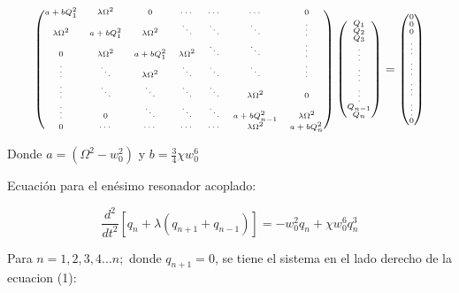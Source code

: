 \documentclass[11pt,letterpaper,twocolumn]{article}
\begin{document}
$${\fontsize{6}{6}\selectfont 
\begin{pmatrix} a+b{ Q }_{ 1 }^{ 2 } & \lambda { \Omega  }^{ 2 } & 0 & \cdots  & \cdots  & \cdots  & 0 \\ \lambda { \Omega  }^{ 2 } & a+b{ Q }_{ 1 }^{ 2 } & \lambda { \Omega  }^{ 2 } & \ddots  & \ddots  & \ddots  & \vdots  \\ 0 & \lambda { \Omega  }^{ 2 } & a+b{ Q }_{ 1 }^{ 2 } & \lambda { \Omega  }^{ 2 } & \ddots  & \ddots  & \vdots  \\ \vdots  & \ddots  & \lambda { \Omega  }^{ 2 } & \ddots  & \ddots  & \ddots  & \vdots  \\ \vdots  & \ddots  & \ddots  & \ddots  & \ddots  & \lambda { \Omega  }^{ 2 } & 0 \\ \vdots  & 0 & \ddots  & \ddots  & \ddots  & a+b{ Q }_{ n-1 }^{ 2 } & \lambda { \Omega  }^{ 2 } \\ 0 & \cdots  & \cdots  & \cdots  & \cdots  & \lambda { \Omega  }^{ 2 } & a+b{ Q }_{ n }^{ 2 } \end{pmatrix}\begin{pmatrix} { Q }_{ 1 } \\ { Q }_{ 2 } \\ { Q }_{ 3 } \\ \vdots  \\ \vdots  \\ \vdots  \\ { Q }_{ n-1 } \\ { Q }_{ n } \end{pmatrix}=\begin{pmatrix} 0 \\ 0 \\ 0 \\ \vdots  \\ \vdots  \\ \vdots  \\ \vdots  \\ 0 \end{pmatrix}}$$

Donde $a=\left(\Omega^{2}-w_{0}^{2}\right)$ y $b= \frac{3}{4}\chi w_{0}^{6}$

Ecuación para el enésimo resonador acoplado:

$$\frac{d^{2}}{dt^{2}}\left[q_{n}+\lambda\left(q_{n+1}+q_{n-1}\right)\right]=-w_{0}^{2}q_{n}+\chi w_{0}^{6}q_{n}^{3}$$

Para $n= 1,2,3,4...n;$ donde $q_{n+1}=0$, se tiene el sistema en el lado derecho de la ecuacion (1):
\end{document}
